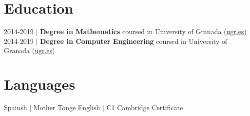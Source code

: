 \documentclass[12pt, letterpaper]{article}
\renewcommand{\large}{\fontsize{14}{20}\selectfont}
\begin{document}
	\section{Education}
	\textcolor{accent-color}{2014-2019 |} {\large \textbf{Degree in Mathematics}} coursed in {\large University of Granada} (\href{https://www.ugr.es}{ugr.es}) \medskip\\
	\textcolor{accent-color}{2014-2019 |} {\large \textbf{Degree in Computer Engineering}} coursed in {\large University of Granada} (\href{https://www.ugr.es}{ugr.es})
	\smallskip

	\section{Languages}
	\textcolor{accent-color}{Spainsh |} Mother Tonge \hspace{2.5em}
	\textcolor{accent-color}{English |} C1 Cambridge Certificate
\end{document}
